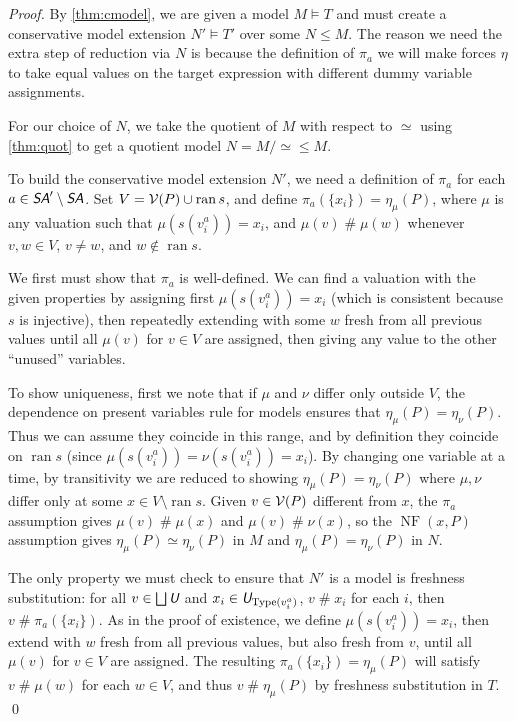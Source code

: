 \documentclass[runningheads,a4paper]{llncs}
\newcommand{\uv}{\textit{\textsf{U}}} %
\newcommand{\sa}{\textit{\textsf{SA}}} %
\newcommand{\type}{{\rm Type}}
\newcommand{\fresh}{\mathbin{\#}}
\DeclareMathOperator{\ran}{ran}
\DeclareMathOperator{\NF}{NF}
\begin{document}
\begin{proof}
By \autoref{thm:cmodel}, we are given a model $M\models T$ and must create a conservative model extension $N'\models T'$ over some $N\le M$. The reason we need the extra step of reduction via $N$ is because the definition of $\pi_a$ we will make forces $\eta$ to take equal values on the target expression with different dummy variable assignments.

For our choice of $N$, we take the quotient of $M$ with respect to $\simeq$ using \autoref{thm:quot} to get a quotient model $N=M/\simeq\le M$.

To build the conservative model extension $N'$, we need a definition of $\pi_a$ for each $a\in\sa'\setminus\sa$. Set $V={\cal V}(P)\cup\ran s$, and define $\pi_a(\{x_i\})=\eta_\mu(P)$, where $\mu$ is any valuation such that $\mu(s(v^a_i))=x_i$, and $\mu(v)\fresh\mu(w)$ whenever $v,w\in V$, $v\ne w$, and $w\notin\ran s$.

We first must show that $\pi_a$ is well-defined. We can find a valuation with the given properties by assigning first $\mu(s(v^a_i))=x_i$ (which is consistent because $s$ is injective), then repeatedly extending with some $w$ fresh from all previous values until all $\mu(v)$ for $v\in V$ are assigned, then giving any value to the other ``unused'' variables.

To show uniqueness, first we note that if $\mu$ and $\nu$ differ only outside $V$, the dependence on present variables rule for models ensures that $\eta_\mu(P)=\eta_\nu(P)$. Thus we can assume they coincide in this range, and by definition they coincide on $\ran s$ (since $\mu(s(v^a_i))=\nu(s(v^a_i))=x_i$). By changing one variable at a time, by transitivity we are reduced to showing $\eta_\mu(P)=\eta_\nu(P)$ where $\mu,\nu$ differ only at some $x\in V\setminus\ran s$. Given $v\in{\cal V}(P)$ different from $x$, the $\pi_a$ assumption gives $\mu(v)\fresh\mu(x)$ and $\mu(v)\fresh\nu(x)$, so the $\NF(x,P)$ assumption gives $\eta_\mu(P)\simeq\eta_\nu(P)$ in $M$ and $\eta_\mu(P)=\eta_\nu(P)$ in $N$.

The only property we must check to ensure that $N'$ is a model is freshness substitution: for all $v\in\bigsqcup\uv$ and $x_i\in\uv_{\type(v^a_i)}$, $v\fresh x_i$ for each $i$, then $v\fresh\pi_a(\{x_i\})$. As in the proof of existence, we define $\mu(s(v^a_i))=x_i$, then extend with $w$ fresh from all previous values, but also fresh from $v$, until all $\mu(v)$ for $v\in V$ are assigned. The resulting $\pi_a(\{x_i\})=\eta_\mu(P)$ will satisfy $v\fresh\mu(w)$ for each $w\in V$, and thus $v\fresh\eta_\mu(P)$ by freshness substitution in $T$.
\qed\end{proof}
\end{document}

